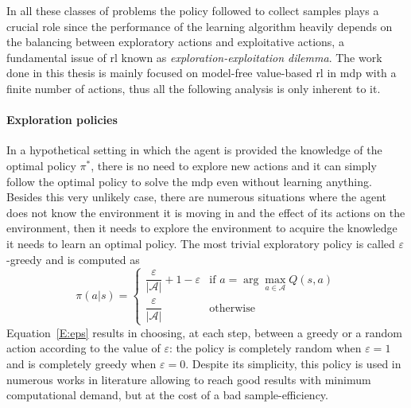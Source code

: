 In all these classes of problems the policy followed to collect samples plays a crucial role since the performance of the learning algorithm heavily depends on the balancing between exploratory actions and exploitative actions, a fundamental issue of \gls{rl} known as \textit{exploration-exploitation dilemma}. The work done in this thesis is mainly focused on model-free value-based \gls{rl} in \gls{mdp} with a finite number of actions, thus all the following analysis is only inherent to it.

\paragraph{Exploration policies}
In a hypothetical setting in which the agent is provided the knowledge of the optimal policy $\pi^*$, there is no need to explore new actions and it can simply follow the optimal policy to solve the \gls{mdp} even without learning anything. Besides this very unlikely case, there are numerous situations where the agent does not know the environment it is moving in and the effect of its actions on the environment, then it needs to explore the environment to acquire the knowledge it needs to learn an optimal policy. The most trivial exploratory policy is called $\varepsilon$-greedy and is computed as
\begin{equation}\label{E:eps}
\pi(a|s)=
    \begin{cases}
    \dfrac{\varepsilon}{|\mathcal{A}|} + 1 - \varepsilon & \text{if } a = \arg\max_{a \in \mathcal{A}}Q(s,a)\\
    \dfrac{\varepsilon}{|\mathcal{A}|} & \text{otherwise}
    \end{cases}
\end{equation}
Equation~\ref{E:eps} results in choosing, at each step, between a greedy or a random action according to the value of $\varepsilon$: the policy is completely random when $\varepsilon = 1$ and is completely greedy when $\varepsilon = 0$.
Despite its simplicity, this policy is used in numerous works in literature allowing to reach good results with minimum computational demand, but at the cost of a bad sample-efficiency.

